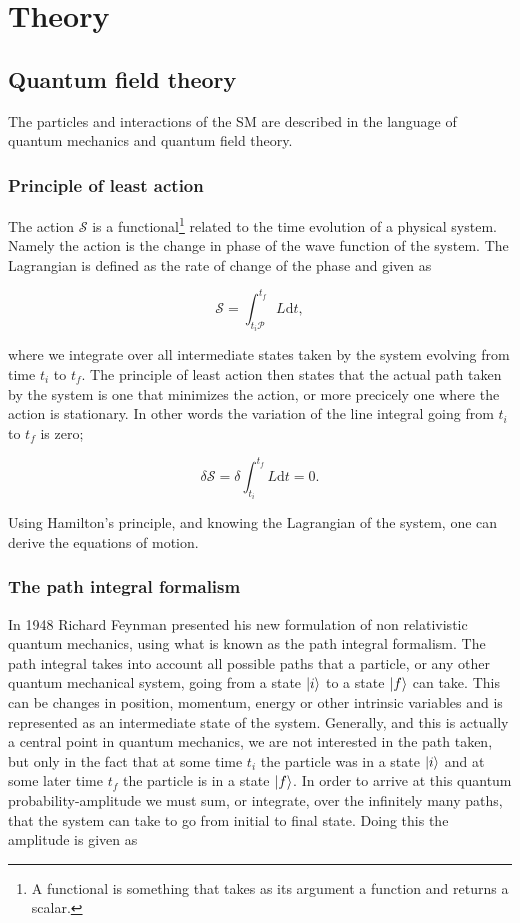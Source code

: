 \section{Theory}
\subsection{Quantum field theory}
The particles and interactions of the SM are described in the language of quantum mechanics and quantum field theory.

\subsubsection{Principle of least action}
The action $\mathcal{S}$ is a functional\footnote{A functional is something that takes as its argument a function and returns a scalar.} related to the time evolution of a physical system. Namely the action is the change in phase of the wave function of the system. The Lagrangian is defined as the rate of change of the phase and given as

\begin{equation}
	\mathcal{S} = \int_{t_i \mathcal{P}}^{t_f} L \textrm{d}t,
\end{equation}

where we integrate over all intermediate states taken by the system evolving from time $t_i$ to $t_f$. The principle of least action then states that the actual path taken by the system is one that minimizes the action, or more precicely one where the action is stationary. In other words the variation of the line integral going from $t_i$ to $t_f$ is zero\cite{goldstein1959};

\begin{equation}
	\delta \mathcal{S} = \delta \int_{t_i}^{t_f} L \textrm{d}t = 0.
\end{equation}

Using Hamilton's principle, and knowing the Lagrangian of the system, one can derive the equations of motion.

\subsubsection{The path integral formalism}
In 1948 Richard Feynman presented his new formulation of non relativistic quantum mechanics, using what is known as the path integral formalism\cite{feynman1948sta}. The path integral takes into account all possible paths that a particle, or any other quantum mechanical system, going from a state $|i \rangle$ to a state $|f \rangle$ can take. This can be changes in position, momentum, energy or other intrinsic variables and is represented as an intermediate state of the system. Generally, and this is actually a central point in quantum mechanics, we are not interested in the path taken, but only in the fact that at some time $t_{i}$ the particle was in a state $|i \rangle$ and at some later time $t_{f}$ the particle is in a state $|f \rangle$. In order to arrive at this quantum probability-amplitude we must sum, or integrate, over the infinitely many paths, that the system can take to go from initial to final state. Doing this the amplitude is given as \cite{richter_path_integrals}

